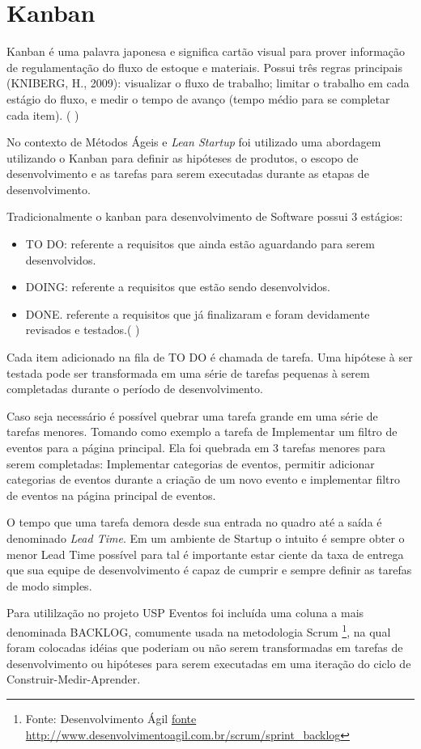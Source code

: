 \section{Kanban}
\par Kanban é uma palavra japonesa e significa cartão visual para prover informação de regulamentação do fluxo de estoque e materiais. Possui três regras principais (KNIBERG, H., 2009): visualizar o fluxo de trabalho; limitar o trabalho em cada estágio do fluxo, e medir o tempo de avanço (tempo médio para se completar cada item). ( \cite{francisco:14})
\par No contexto de Métodos Ágeis e \emph{Lean Startup} foi utilizado uma abordagem utilizando o Kanban para definir as hipóteses de produtos, o escopo de desenvolvimento e as tarefas para serem executadas durante as etapas de desenvolvimento.
\par Tradicionalmente o kanban para desenvolvimento de Software possui 3 estágios:
\begin{itemize}
        \item TO DO: referente a requisitos que ainda estão aguardando para serem
desenvolvidos.
        \item DOING: referente a requisitos que estão sendo desenvolvidos.
        \item DONE. referente a requisitos que já finalizaram e foram devidamente
revisados e testados.( \cite{francisco:14})
\end{itemize}
\par Cada item adicionado na fila de TO DO é chamada de tarefa. Uma hipótese à ser testada pode ser transformada em uma série de tarefas pequenas à serem completadas durante o período de desenvolvimento.
\par Caso seja necessário é possível quebrar uma tarefa grande em uma série de tarefas menores. Tomando como exemplo a tarefa de Implementar um filtro de eventos para a página principal. Ela foi quebrada em 3 tarefas menores para serem completadas: Implementar categorias de eventos, permitir adicionar categorias de eventos durante a criação de um novo evento e implementar filtro de eventos na página principal de eventos.
\par O tempo que uma tarefa demora desde sua entrada no quadro até a saída é denominado \emph{Lead Time}. Em um ambiente de Startup o intuito é sempre obter o menor Lead Time possível para tal é importante estar ciente da taxa de entrega que sua equipe de desenvolvimento é capaz de cumprir e sempre definir as tarefas de modo simples.
\par Para utililzação no projeto USP Eventos foi incluída uma coluna a mais denominada BACKLOG, comumente usada na metodologia Scrum \footnote{Fonte: Desenvolvimento Ágil \url{fonte http://www.desenvolvimentoagil.com.br/scrum/sprint_backlog}}, na qual foram colocadas idéias que poderiam ou não serem transformadas em tarefas de desenvolvimento ou hipóteses para serem executadas em uma iteração do ciclo de Construir-Medir-Aprender.
